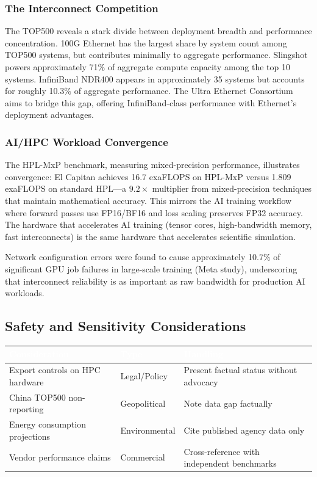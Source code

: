 \documentclass[11pt,letterpaper]{article}
\newcommand{\tableheader}[1]{\textbf{\sffamily\textcolor{white}{#1}}}
\begin{document}
\subsubsection{The Interconnect Competition}

The TOP500 reveals a stark divide between deployment breadth and performance concentration. 100G Ethernet has the largest share by system count among TOP500 systems, but contributes minimally to aggregate performance. Slingshot powers approximately 71\% of aggregate compute capacity among the top 10 systems. InfiniBand NDR400 appears in approximately 35 systems but accounts for roughly 10.3\% of aggregate performance. The Ultra Ethernet Consortium aims to bridge this gap, offering InfiniBand-class performance with Ethernet's deployment advantages.

\subsubsection{AI/HPC Workload Convergence}

The HPL-MxP benchmark, measuring mixed-precision performance, illustrates convergence: El Capitan achieves 16.7 exaFLOPS on HPL-MxP versus 1.809 exaFLOPS on standard HPL---a $9.2\times$ multiplier from mixed-precision techniques that maintain mathematical accuracy. This mirrors the AI training workflow where forward passes use FP16/BF16 and loss scaling preserves FP32 accuracy. The hardware that accelerates AI training (tensor cores, high-bandwidth memory, fast interconnects) is the same hardware that accelerates scientific simulation.

Network configuration errors were found to cause approximately 10.7\% of significant GPU job failures in large-scale training (Meta study), underscoring that interconnect reliability is as important as raw bandwidth for production AI workloads.

\subsection{Safety and Sensitivity Considerations}

\begin{center}
\begin{tabularx}{\textwidth}{L{3.5cm}L{2cm}X}
\toprule
{}
\tableheader{Consideration} & \tableheader{Type} & \tableheader{Handling} \\
\midrule
Export controls on HPC hardware & Legal/Policy & Present factual status without advocacy \\
China TOP500 non-reporting & Geopolitical & Note data gap factually \\
Energy consumption projections & Environmental & Cite published agency data only \\
Vendor performance claims & Commercial & Cross-reference with independent benchmarks \\
\bottomrule
\end{tabularx}
\end{center}
\end{document}
